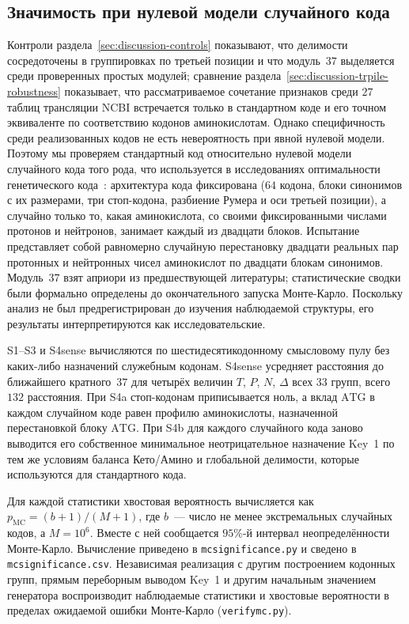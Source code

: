 \documentclass[11pt,a4paper]{article}
\renewcommand{\_}{\origunderscore\allowbreak}
\begin{document}
\subsection{Значимость при нулевой модели случайного кода}
\label{sec:discussion-montecarlo}

Контроли раздела~\ref{sec:discussion-controls} показывают, что
делимости сосредоточены в группировках по третьей позиции и что
модуль~$37$ выделяется среди проверенных простых модулей; сравнение
раздела~\ref{sec:discussion-trpile-robustness} показывает, что
рассматриваемое сочетание признаков среди $27$ таблиц трансляции
NCBI встречается только в стандартном коде и его точном эквиваленте
по соответствию кодонов аминокислотам. Однако специфичность среди
реализованных кодов не есть невероятность при явной нулевой модели.
Поэтому мы проверяем
стандартный код относительно нулевой модели случайного кода
того рода, что используется в исследованиях оптимальности
генетического кода~\citep{freeland1998}: архитектура кода
фиксирована ($64$ кодона, блоки синонимов с их размерами, три
стоп-кодона, разбиение Румера и оси третьей позиции), а случайно
только то, какая аминокислота, со своими фиксированными числами
протонов и нейтронов, занимает каждый из двадцати блоков.
Испытание представляет собой равномерно случайную перестановку
двадцати реальных пар протонных и нейтронных чисел аминокислот по
двадцати блокам синонимов. Модуль~$37$ взят априори из
предшествующей литературы; статистические сводки были формально
определены до окончательного запуска Монте-Карло. Поскольку
анализ не был предрегистрирован до изучения наблюдаемой структуры,
его результаты интерпретируются как исследовательские.

S1--S3 и S4sense вычисляются по шестидесятикодонному смысловому
пулу без каких-либо назначений служебным кодонам. S4sense
усредняет расстояния до ближайшего кратного~$37$ для четырёх
величин $T$, $P$, $N$, $\Delta$ всех $33$ групп, всего $132$
расстояния. При S4a стоп-кодонам приписывается ноль, а вклад
$\mathrm{ATG}$ в каждом случайном коде равен профилю аминокислоты,
назначенной перестановкой блоку $\mathrm{ATG}$. При S4b для
каждого случайного кода заново выводится его собственное
минимальное неотрицательное назначение Key~1 по тем же условиям
баланса Кето/Амино и глобальной делимости, которые используются
для стандартного кода.

Для каждой статистики хвостовая вероятность вычисляется как
$p_{\mathrm{MC}}=(b+1)/(M+1)$, где $b$~--- число не менее
экстремальных случайных кодов, а $M=10^{6}$. Вместе с ней
сообщается $95\%$-й интервал неопределённости Монте-Карло.
Вычисление приведено в \texttt{mc\_significance.py} и сведено в
\texttt{mc\_significance.csv}. Независимая реализация с другим
построением кодонных групп, прямым переборным выводом Key~1 и
другим начальным значением генератора воспроизводит наблюдаемые
статистики и хвостовые вероятности в пределах ожидаемой ошибки
Монте-Карло (\texttt{verify\_mc.py}).
\end{document}
